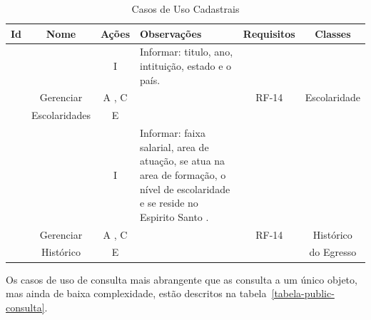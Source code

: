 \begin{table}[h]
	\centering  \vspace{0.5cm} 	\footnotesize 
	\caption{Casos de Uso Cadastrais}
	\begin{tabular}{|c|c|c|p{6cm}|c|c|} \hline  \rowcolor[rgb]{0.8,0.8,0.8}
 				
 		Id & Nome  &  Ações  &  Observações & Requisitos   & Classes  \\ 	\hline 
 		
 		{}    &    {}    &   I   &    Informar: titulo, ano, intituição, estado e o país.  &   {}   &   {}    \\\cline{3-4}
 		\UC\label{uc-escolaridade}  &   Gerenciar    &   A  , C   &   {}   &    RF-14   &    Escolaridade  \\ \cline{3-4}
 		{}  & Escolaridades  &  E  &   {}    &   {}  &   {}  \\ \hline 
 		
 		{}    &    {}    &   I   &    Informar: faixa salarial, area de atuação, se atua na area de formação, o nível de escolaridade e se reside no Espirito Santo .  &   {}   &     \\\cline{3-4}
 		\UC\label{uc-historico}  &   Gerenciar    &   A  , C   &   {}   &    RF-14   &  Histórico      \\ \cline{3-4}
 		{}  & Histórico   &  E  &   {}    &   {}  &   do Egresso  \\ \hline 
 		
	\end{tabular}
	\label{tabela-public-cadastrais}
\end{table}




\newpage
Os casos de uso de consulta mais abrangente que as consulta a um único objeto, mas ainda de baixa complexidade, estão descritos na tabela~\ref{tabela-public-consulta}.

